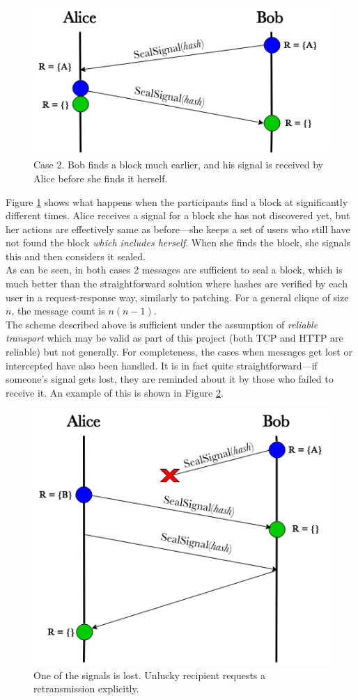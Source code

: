 \documentclass[a4paper, twoside, 12pt]{report}
\begin{document}
\begin{figure}[H]
    \captionsetup{width=0.76\textwidth}
    \centering
    \includegraphics[width=0.6\linewidth]{pics/sealing_lag.png}
    \caption{\label{fig:sealing_lag} Case 2. Bob finds a block much earlier, and his signal is received by Alice before she finds it herself.}
\end{figure}

Figure \ref{fig:sealing_lag} shows what happens when the participants find a block at significantly different times. Alice receives a signal for a block she has not discovered yet, but her actions are effectively same as before---she keeps a set of users who still have not found the block \emph{which includes herself}. When she finds the block, she signals this and then considers it sealed. \\


As can be seen, in both cases 2 messages are sufficient to seal a block, which is much better than the straightforward solution where hashes are verified by each user in a request-response way, similarly to patching. For a general clique of size $n$, the message count is $n (n-1)$. \\

The scheme described above is sufficient under the assumption of \emph{reliable transport} which may be valid as part of this project (both TCP and HTTP are reliable) but not generally. For completeness, the cases when messages get lost or intercepted have also been handled. It is in fact quite straightforward---if someone's signal gets lost, they are reminded about it by those who failed to receive it. An example of this is shown in Figure \ref{fig:sealing_lost}.

\begin{figure}[H]
    \captionsetup{width=0.76\textwidth}
    \centering
    \includegraphics[width=0.6\linewidth]{pics/sealing_lost.png}
    \caption{\label{fig:sealing_lost} One of the signals is lost. Unlucky recipient requests a retransmission explicitly.}
\end{figure}
\end{document}
